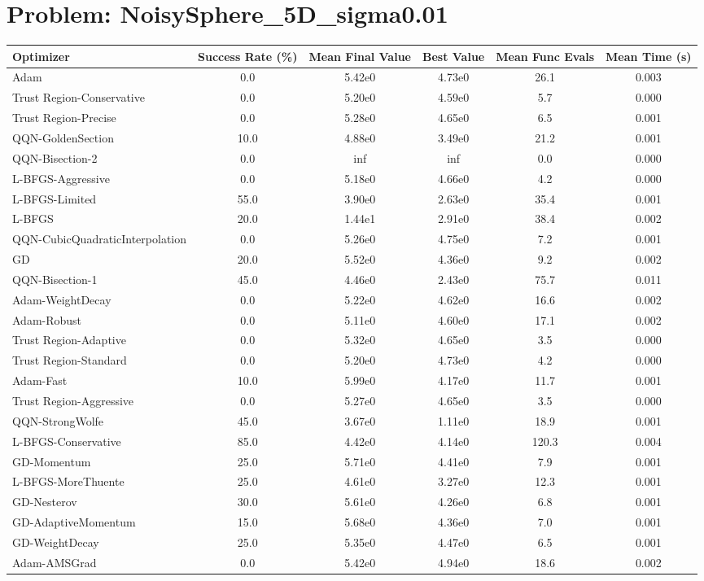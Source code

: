 \documentclass{article}
\begin{document}
\section{Problem: NoisySphere\_5D\_sigma0.01}
\begin{longtable}{p{3cm}*{5}{c}}
\toprule
\textbf{Optimizer} & \textbf{Success Rate (\%)} & \textbf{Mean Final Value} & \textbf{Best Value} & \textbf{Mean Func Evals} & \textbf{Mean Time (s)} \\
\midrule
Adam & 0.0 & 5.42e0 & 4.73e0 & 26.1 & 0.003 \\
Trust Region-Conservative & 0.0 & 5.20e0 & 4.59e0 & 5.7 & 0.000 \\
Trust Region-Precise & 0.0 & 5.28e0 & 4.65e0 & 6.5 & 0.001 \\
QQN-GoldenSection & 10.0 & 4.88e0 & 3.49e0 & 21.2 & 0.001 \\
QQN-Bisection-2 & 0.0 & inf & inf & 0.0 & 0.000 \\
L-BFGS-Aggressive & 0.0 & 5.18e0 & 4.66e0 & 4.2 & 0.000 \\
L-BFGS-Limited & 55.0 & 3.90e0 & 2.63e0 & 35.4 & 0.001 \\
L-BFGS & 20.0 & 1.44e1 & 2.91e0 & 38.4 & 0.002 \\
QQN-CubicQuadraticInterpolation & 0.0 & 5.26e0 & 4.75e0 & 7.2 & 0.001 \\
GD & 20.0 & 5.52e0 & 4.36e0 & 9.2 & 0.002 \\
QQN-Bisection-1 & 45.0 & 4.46e0 & 2.43e0 & 75.7 & 0.011 \\
Adam-WeightDecay & 0.0 & 5.22e0 & 4.62e0 & 16.6 & 0.002 \\
Adam-Robust & 0.0 & 5.11e0 & 4.60e0 & 17.1 & 0.002 \\
Trust Region-Adaptive & 0.0 & 5.32e0 & 4.65e0 & 3.5 & 0.000 \\
Trust Region-Standard & 0.0 & 5.20e0 & 4.73e0 & 4.2 & 0.000 \\
Adam-Fast & 10.0 & 5.99e0 & 4.17e0 & 11.7 & 0.001 \\
Trust Region-Aggressive & 0.0 & 5.27e0 & 4.65e0 & 3.5 & 0.000 \\
QQN-StrongWolfe & 45.0 & 3.67e0 & 1.11e0 & 18.9 & 0.001 \\
L-BFGS-Conservative & 85.0 & 4.42e0 & 4.14e0 & 120.3 & 0.004 \\
GD-Momentum & 25.0 & 5.71e0 & 4.41e0 & 7.9 & 0.001 \\
L-BFGS-MoreThuente & 25.0 & 4.61e0 & 3.27e0 & 12.3 & 0.001 \\
GD-Nesterov & 30.0 & 5.61e0 & 4.26e0 & 6.8 & 0.001 \\
GD-AdaptiveMomentum & 15.0 & 5.68e0 & 4.36e0 & 7.0 & 0.001 \\
GD-WeightDecay & 25.0 & 5.35e0 & 4.47e0 & 6.5 & 0.001 \\
Adam-AMSGrad & 0.0 & 5.42e0 & 4.94e0 & 18.6 & 0.002 \\
\bottomrule
\end{longtable}
\end{document}
